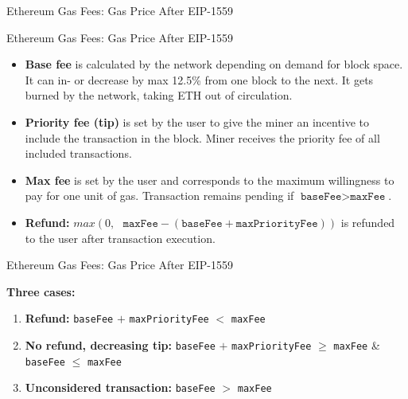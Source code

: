 \documentclass[handout]{beamer}
\begin{document}
\begin{frame}{Ethereum Gas Fees: Gas Price After EIP-1559}
	\begin{center}
		\begin{tikzpicture}
			
		\end{tikzpicture}
	\end{center}	
\end{frame}

\begin{frame}{Ethereum Gas Fees: Gas Price After EIP-1559}
	\begin{itemize}
		\item \textbf{Base fee} is calculated by the network depending on demand for block space. It can in- or decrease by max 12.5\% from one block to the next. It gets burned by the network, taking ETH out of circulation.
		\item \textbf{Priority fee (tip)} is set by the user to give the miner an incentive to include the transaction in the block. Miner receives the priority fee of all included transactions.
		\item \textbf{Max fee} is set by the user and corresponds to the maximum willingness to pay for one unit of gas. Transaction remains pending if $\texttt{baseFee}  > \texttt{maxFee} $.
		\item \textbf{Refund:} $max \left(0, \text{ }\texttt{maxFee} - (\texttt{baseFee}  + \texttt{maxPriorityFee} )\right)$ is refunded to the user after transaction execution. 
	\end{itemize}	
\end{frame}

\begin{frame}{Ethereum Gas Fees: Gas Price After EIP-1559}
	\begin{figure}
		
	\end{figure}
	
	\vspace{-1.25em}
	
	\scriptsize
	\textbf{Three cases:}
	\begin{enumerate}
		\item<3-> \textbf{Refund:} \texttt{baseFee} $+$ \texttt{maxPriorityFee} $<$ \texttt{maxFee}
		\item<5-> \textbf{No refund, decreasing tip:} \texttt{baseFee} $+$ \texttt{maxPriorityFee} $\geq$ \texttt{maxFee} \& \texttt{baseFee} $\leq$ \texttt{maxFee}
		\item<7-> \textbf{Unconsidered transaction:} \texttt{baseFee} $>$ \texttt{maxFee}
	\end{enumerate}
	
\end{frame}
\end{document}
